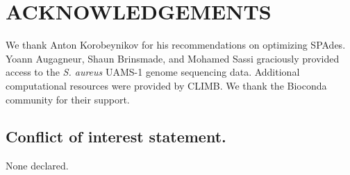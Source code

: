 \documentclass[a4,center,fleqn]{NAR}
\begin{document}
\section{ACKNOWLEDGEMENTS}
We thank Anton Korobeynikov for his recommendations on optimizing SPAdes. Yoann Augagneur, Shaun Brinsmade, and Mohamed Sassi graciously provided access to the \textit{S. aureus} UAMS-1 genome sequencing data.  Additional computational resources were provided by CLIMB\cite{Connor2016}. We thank the Bioconda\cite{Dale2017} community for their support.


\subsection{Conflict of interest statement.}
None declared.



\end{document}
